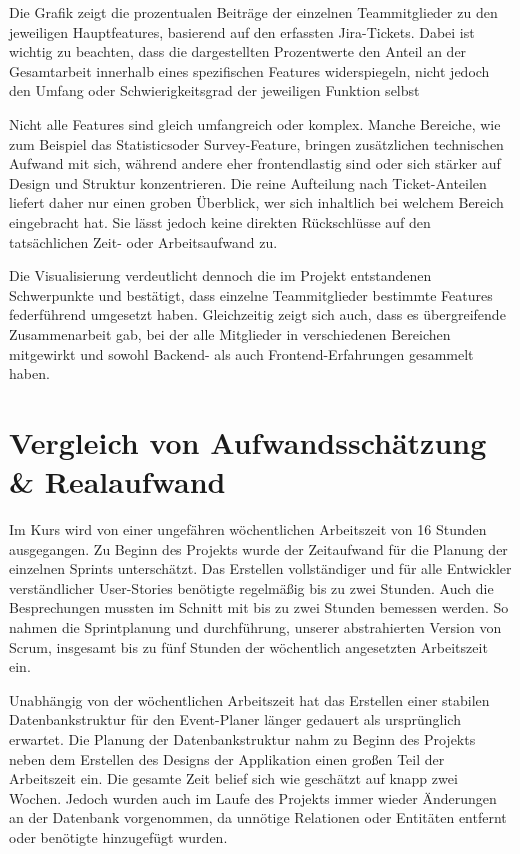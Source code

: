 \documentclass[a4paper,12pt]{article}
\begin{document}
\noindent
Die Grafik zeigt die prozentualen Beiträge der einzelnen Teammitglieder zu den jeweiligen Hauptfeatures, basierend auf den erfassten Jira-Tickets. Dabei ist wichtig zu beachten, dass die dargestellten Prozentwerte den Anteil an der Gesamtarbeit innerhalb eines spezifischen Features widerspiegeln, nicht jedoch den Umfang oder Schwierigkeitsgrad der jeweiligen Funktion selbst 

Nicht alle Features sind gleich umfangreich oder komplex. Manche Bereiche, wie zum Beispiel das Statisticsoder Survey-Feature, bringen zusätzlichen technischen Aufwand mit sich, während andere eher frontendlastig sind oder sich stärker auf Design und Struktur konzentrieren. Die reine Aufteilung nach Ticket-Anteilen liefert daher nur einen groben Überblick, wer sich inhaltlich bei welchem Bereich eingebracht hat. Sie lässt jedoch keine direkten Rückschlüsse auf den tatsächlichen Zeit- oder Arbeitsaufwand zu. 

Die Visualisierung verdeutlicht dennoch die im Projekt entstandenen Schwerpunkte und bestätigt, dass einzelne Teammitglieder bestimmte Features federführend umgesetzt haben. Gleichzeitig zeigt sich auch, dass es übergreifende Zusammenarbeit gab, bei der alle Mitglieder in verschiedenen Bereichen mitgewirkt und sowohl Backend- als auch Frontend-Erfahrungen gesammelt haben.

\newpage


\section{Vergleich von Aufwandsschätzung \& Realaufwand}

Im Kurs wird von einer ungefähren wöchentlichen Arbeitszeit von 16 Stunden ausgegangen.
Zu Beginn des Projekts wurde der Zeitaufwand für die Planung der einzelnen Sprints unterschätzt. Das Erstellen vollständiger und für alle Entwickler verständlicher User-Stories benötigte regelmäßig bis zu zwei Stunden. Auch die Besprechungen mussten im Schnitt mit bis zu zwei Stunden bemessen werden. So nahmen die Sprintplanung und durchführung, unserer abstrahierten Version von Scrum, insgesamt bis zu fünf Stunden der wöchentlich angesetzten Arbeitszeit ein.

Unabhängig von der wöchentlichen Arbeitszeit hat das Erstellen einer stabilen Datenbankstruktur für den Event-Planer länger gedauert als ursprünglich erwartet. Die Planung der Datenbankstruktur nahm zu Beginn des Projekts neben dem Erstellen des Designs der Applikation einen großen Teil der Arbeitszeit ein. Die gesamte Zeit belief sich wie geschätzt auf knapp zwei Wochen. Jedoch wurden auch im Laufe des Projekts immer wieder Änderungen an der Datenbank vorgenommen, da unnötige Relationen oder Entitäten entfernt oder benötigte hinzugefügt wurden.
\end{document}
